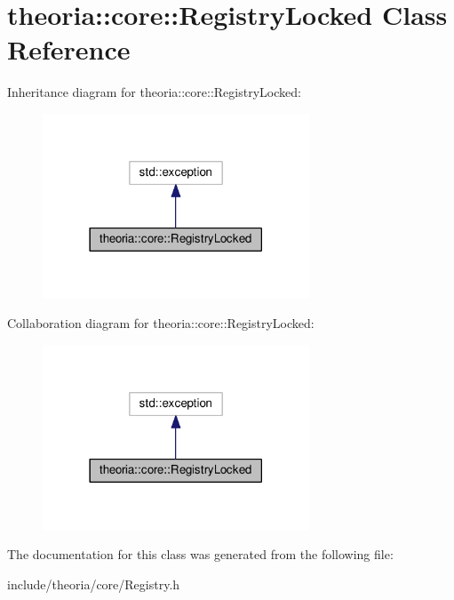\hypertarget{classtheoria_1_1core_1_1RegistryLocked}{}\section{theoria\+:\+:core\+:\+:Registry\+Locked Class Reference}
\label{classtheoria_1_1core_1_1RegistryLocked}


Inheritance diagram for theoria\+:\+:core\+:\+:Registry\+Locked\+:
\nopagebreak
\begin{figure}[H]
\begin{center}
\leavevmode
\includegraphics[width=225pt]{classtheoria_1_1core_1_1RegistryLocked__inherit__graph}
\end{center}
\end{figure}


Collaboration diagram for theoria\+:\+:core\+:\+:Registry\+Locked\+:
\nopagebreak
\begin{figure}[H]
\begin{center}
\leavevmode
\includegraphics[width=225pt]{classtheoria_1_1core_1_1RegistryLocked__coll__graph}
\end{center}
\end{figure}


The documentation for this class was generated from the following file\+:\begin{DoxyCompactItemize}
\item 
include/theoria/core/Registry.\+h\end{DoxyCompactItemize}
